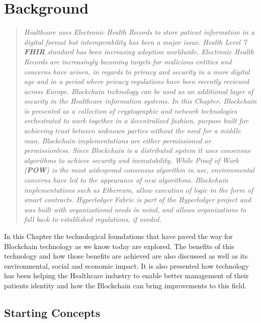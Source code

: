 \chapter{Background}\label{background}


\begin{quote} 
  \emph{Healthcare uses Electronic Health Records to store patient
  information in a digital format but interoperability has been a major issue.
  Health Level 7 \textbf{FHIR} standard has been increasing adoption worldwide.
  Electronic Health Records are increasingly becoming targets for malicious
  entities and concerns have arisen, in regards to privacy and security in a
  more digital age and in a period where privacy regulations have been recently
  reviewed across Europe. Blockchain technology can be used as an additional
  layer of security in the Healthcare information systems. In this Chapter,
  Blockchain is presented as a collection of cryptographic and network
  technologies orchestrated to work together in a decentralized fashion,
  purpose built for achieving trust between unknown parties without the need
  for a middle man. Blockchain implementations are either permissioned or
  permissionless. Since Blockchain is a distributed system it uses consensus
  algorithms to achieve security and immutability. While Proof of Work
  (\textbf{POW}) is the most widespread consensus algorithm in use,
  environmental concerns have led to the appearance of new algorithms.
  Blockchain implementations such as Ethereum, allow execution of logic in the
  form of smart contracts. Hyperledger Fabric is part of the Hyperledger
  project and was built with organizational needs in mind, and allows
  organizations to fall back to established regulations, if needed.}
\end{quote}


In this Chapter the technological foundations that have paved the way for
Blockchain technology as we know today are explored. The benefits of this
technology and how those benefits are achieved are also discussed as well as
its environmental, social and economic impact. It is also presented how
technology has been helping the Healthcare industry to enable better management
of their patients identity and how the Blockchain can bring improvements to
this field.

\section{Starting Concepts}

